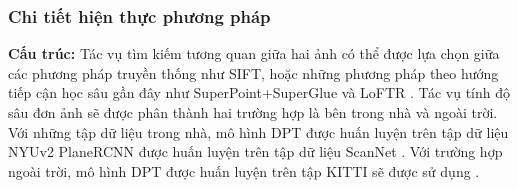 \subsubsection*{Chi tiết hiện thực phương pháp}

\textbf{Cấu trúc:} Tác vụ tìm kiếm tương quan giữa hai ảnh có thể được lựa chọn giữa các phương pháp truyền thống như SIFT, hoặc những phương pháp theo hướng tiếp cận học sâu gần đây như SuperPoint+SuperGlue \cite{sarlin2020superglue} và LoFTR \cite{sun2021loftr}. Tác vụ tính độ sâu đơn ảnh sẽ được phân thành hai trường hợp là bên trong nhà và ngoài trời. Với những tập dữ liệu trong nhà, mô hình DPT \cite{ranftl2021vision} được huấn luyện trên tập dữ liệu NYUv2 \cite{silberman2012indoor} PlaneRCNN \cite{liu2019planercnn} được huấn luyện trên tập dữ liệu ScanNet \cite{dai2017scannet}. Với trường hợp ngoài trời, mô hình DPT \cite{ranftl2021vision} được huấn luyện trên tập KITTI sẽ được sử dụng \cite{geiger2012we}.

